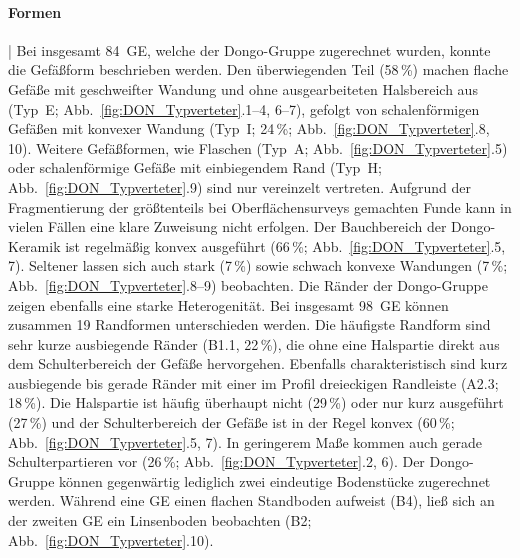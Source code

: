 \paragraph{Formen}\hspace{-.5em}|\hspace{.5em}%
Bei insgesamt 84~GE, welche der Dongo-Gruppe zugerechnet wurden, konnte die Gefäßform beschrieben werden. Den überwiegenden Teil (58\,\%) machen flache Gefäße mit geschweifter Wandung und ohne ausgearbeiteten Halsbereich aus (Typ~E; Abb.~\ref{fig:DON_Typverteter}.1--4, 6--7), gefolgt von schalenförmigen Gefäßen mit konvexer Wandung (Typ~I; 24\,\%; Abb.~\ref{fig:DON_Typverteter}.8, 10). Weitere Gefäßformen, wie Flaschen (Typ~A; Abb.~\ref{fig:DON_Typverteter}.5) oder schalenförmige Gefäße mit einbiegendem Rand (Typ~H; Abb.~\ref{fig:DON_Typverteter}.9) sind nur vereinzelt vertreten. Aufgrund der Fragmentierung der größtenteils bei Oberflächensurveys gemachten Funde kann in vielen Fällen eine klare Zuweisung nicht erfolgen. Der Bauchbereich der Dongo-Keramik ist regelmäßig konvex ausgeführt (66\,\%; Abb.~\ref{fig:DON_Typverteter}.5, 7). Seltener lassen sich auch stark (7\,\%) sowie schwach konvexe Wandungen (7\,\%; Abb.~\ref{fig:DON_Typverteter}.8--9) beobachten. Die Ränder der Dongo-Gruppe zeigen ebenfalls eine starke Heterogenität. Bei insgesamt 98~GE können zusammen 19 Randformen unterschieden werden. Die häufigste Randform sind sehr kurze ausbiegende Ränder (B1.1, 22\,\%), die ohne eine Halspartie direkt aus dem Schulterbereich der Gefäße hervorgehen. Ebenfalls charakteristisch sind kurz ausbiegende bis gerade Ränder mit einer im Profil dreieckigen Randleiste (A2.3; 18\,\%). Die Halspartie ist häufig überhaupt nicht (29\,\%) oder nur kurz ausgeführt (27\,\%) und der Schulterbereich der Gefäße ist in der Regel konvex (60\,\%; Abb.~\ref{fig:DON_Typverteter}.5, 7). In geringerem Maße kommen auch gerade Schulterpartieren vor (26\,\%; Abb.~\ref{fig:DON_Typverteter}.2, 6). Der Dongo-Gruppe können gegenwärtig lediglich zwei eindeutige Bodenstücke zugerechnet werden. Während eine GE einen flachen Standboden aufweist (B4), ließ sich an der zweiten GE ein Linsenboden beobachten (B2; Abb.~\ref{fig:DON_Typverteter}.10).


